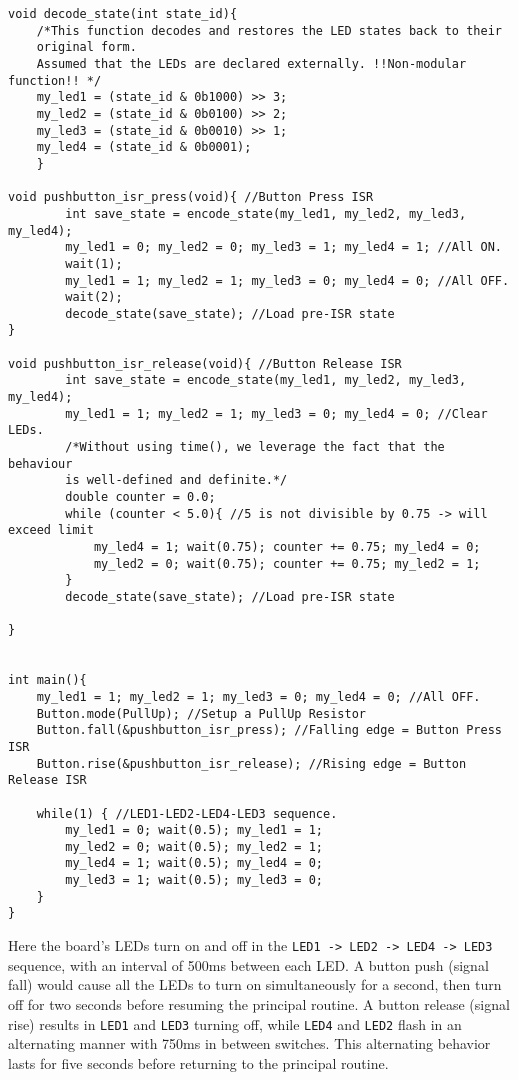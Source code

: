 \documentclass{article}
\begin{document}
\begin{verbatim}
void decode_state(int state_id){
    /*This function decodes and restores the LED states back to their
    original form.
    Assumed that the LEDs are declared externally. !!Non-modular function!! */
    my_led1 = (state_id & 0b1000) >> 3;
    my_led2 = (state_id & 0b0100) >> 2;
    my_led3 = (state_id & 0b0010) >> 1;
    my_led4 = (state_id & 0b0001);
    }

void pushbutton_isr_press(void){ //Button Press ISR
        int save_state = encode_state(my_led1, my_led2, my_led3, my_led4);
        my_led1 = 0; my_led2 = 0; my_led3 = 1; my_led4 = 1; //All ON.
        wait(1);
        my_led1 = 1; my_led2 = 1; my_led3 = 0; my_led4 = 0; //All OFF.
        wait(2);
        decode_state(save_state); //Load pre-ISR state
}

void pushbutton_isr_release(void){ //Button Release ISR
        int save_state = encode_state(my_led1, my_led2, my_led3, my_led4);
        my_led1 = 1; my_led2 = 1; my_led3 = 0; my_led4 = 0; //Clear LEDs.
        /*Without using time(), we leverage the fact that the behaviour
        is well-defined and definite.*/
        double counter = 0.0;
        while (counter < 5.0){ //5 is not divisible by 0.75 -> will exceed limit
            my_led4 = 1; wait(0.75); counter += 0.75; my_led4 = 0;
            my_led2 = 0; wait(0.75); counter += 0.75; my_led2 = 1;
        }
        decode_state(save_state); //Load pre-ISR state
       
}


int main(){
    my_led1 = 1; my_led2 = 1; my_led3 = 0; my_led4 = 0; //All OFF.
    Button.mode(PullUp); //Setup a PullUp Resistor
    Button.fall(&pushbutton_isr_press); //Falling edge = Button Press ISR
    Button.rise(&pushbutton_isr_release); //Rising edge = Button Release ISR
    
    while(1) { //LED1-LED2-LED4-LED3 sequence.
        my_led1 = 0; wait(0.5); my_led1 = 1;
        my_led2 = 0; wait(0.5); my_led2 = 1;
        my_led4 = 1; wait(0.5); my_led4 = 0;
        my_led3 = 1; wait(0.5); my_led3 = 0;    
    }
}
\end{verbatim}


Here the board's LEDs turn on and off in the \texttt{LED1 -> LED2 -> LED4 -> LED3} sequence, with an interval of 500ms between each LED. A button push (signal fall) would cause all the LEDs to turn on simultaneously for a second, then turn off for two seconds before resuming the principal routine. A button release (signal rise) results in \texttt{LED1} and \texttt{LED3} turning off, while \texttt{LED4} and \texttt{LED2} flash in an alternating manner with 750ms in between switches. This alternating behavior lasts for five seconds before returning to the principal routine.
\end{document}

